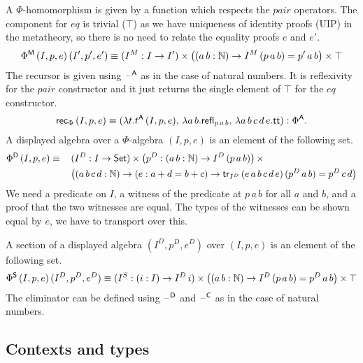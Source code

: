 \documentclass[acmsmall,review,anonymous]{acmart}\settopmatter{printfolios=true,printccs=false,printacmref=false}
\begin{document}
A $\Phi$-homomorphism is given by a function which respects the
$\mathit{pair}$ operators. The component for $\mathit{eq}$ is trivial ($\top$)
as we have uniqueness of identity proofs (UIP) in the metatheory, so
there is no need to relate the equality proofs $e$ and $e'$.
\[
\Phi^{\mathsf{M}}\,(I,p,e)\,(I',p',e')\equiv (I^M:I\rightarrow I')\times\big((a\,b:\mathbb{N})\rightarrow I^M\,(p\,a\,b)=p'\,a\,b\big)\times\top
\]
The recursor is given using $\mathord{\hspace{1pt}\text{--}\hspace{1pt}}^{\mathsf{A}}$ as in the case of natural
numbers. It is reflexivity for the $\mathit{pair}$ constructor and it
just returns the single element of $\top$ for the $\mathit{eq}$
constructor.
\[
\mathsf{rec}_\Phi\,(I,p,e) \equiv (\lambda t.t^{\mathsf{A}}\,(I,p,e),\, \lambda a\,b.\mathsf{refl}_{p\,a\,b},\, \lambda a\,b\,c\,d\,e.\mathsf{tt}):\Phi^{\mathsf{A}}.
\]
A displayed algebra over a $\Phi$-algebra $(I,p,e)$ is an element of
the following set.
\begin{alignat*}{5}
  & \Phi^{\mathsf{D}}\,(I,p,e) \equiv\, &&  (I^D:I\rightarrow\mathsf{Set})\times\big(p^D:(a\,b:\mathbb{N})\rightarrow I^D\,(p\,a\,b)\big)\,\times \\
  & && \big((a\,b\,c\,d:\mathbb{N})\rightarrow(e:a+d=b+c)\rightarrow\mathsf{tr}_{I^D}\,(e\,a\,b\,c\,d\,e)\,(p^D\,a\,b)=p^D\,c\,d\big)
\end{alignat*}
We need a predicate on $I$, a witness of the predicate at $p\,a\,b$
for all $a$ and $b$, and a proof that the two witnesses are equal. The
types of the witnesses can be shown equal by $e$, we have to transport
over this.

A section of a displayed algebra $(I^D,p^D,e^D)$ over $(I,p,e)$ is an
element of the following set.
\[
\Phi^{\mathsf{S}}\,(I,p,e)\,(I^D,p^D,e^D)\equiv (I^S:(i:I)\rightarrow I^D\,i)\times\big((a\,b:\mathbb{N})\rightarrow I^D\,(p\,a\,b)=p^D\,a\,b\big)\times\top
\]
The eliminator can be defined using $\mathord{\hspace{1pt}\text{--}\hspace{1pt}}^{\mathsf{D}}$ and $\mathord{\hspace{1pt}\text{--}\hspace{1pt}}^{\mathsf{C}}$ as in
the case of natural numbers.

\subsection{Contexts and types}
\label{sec:conty}
\end{document}
